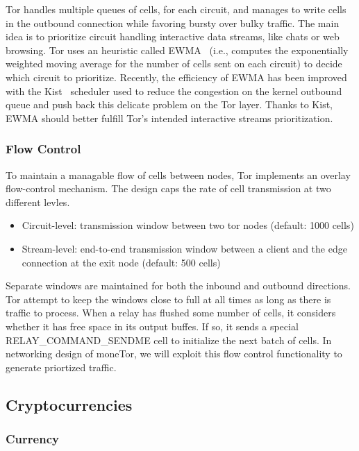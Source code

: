 Tor handles multiple queues of cells, for each circuit, and manages to write
cells in the outbound connection while favoring bursty over bulky traffic. The
main idea is to prioritize circuit handling interactive data streams, like chats
or web browsing. Tor uses an heuristic called EWMA~\cite{ccs10-scheduling}
(i.e., computes the exponentially weighted moving average for the number of
cells sent on each circuit) to decide which circuit to prioritize. Recently, the
efficiency of EWMA has been improved with the Kist~\cite{jansen14-kist}
scheduler used to reduce the congestion on the kernel outbound queue and push
back this delicate problem on the Tor layer. Thanks to Kist, EWMA should better
fulfill Tor's intended interactive streams prioritization. 

\subsubsection{Flow Control}

To maintain a managable flow of cells between nodes, Tor implements an overlay
flow-control mechanism. The design caps the rate of cell transmission at two
different levles.

\begin{itemize}
\item Circuit-level: transmission window between two tor nodes (default: 1000 cells)
\item Stream-level: end-to-end transmission window between a client and the
  edge connection at the exit node (default: 500 cells)
\end{itemize}

Separate windows are maintained for both the inbound and outbound
directions. Tor attempt to keep the windows close to full at all times as long
as there is traffic to process. When a relay has flushed some number of cells,
it considers whether it has free space in its output buffes. If so, it sends a
special RELAY\_COMMAND\_SENDME cell to initialize the next batch of cells. In
networking design of moneTor, we will exploit this flow control functionality to
generate priortized traffic.

\subsection{Cryptocurrencies}

\subsubsection{Currency}

